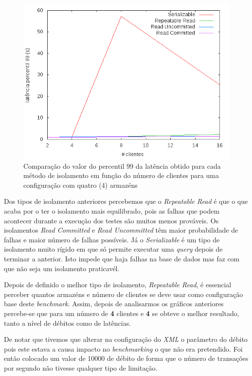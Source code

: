 \begin{figure}[!h]
\centering
\includegraphics[scale=.5]{img/questao-1/diff-lat-pct99-4-arm}
\caption{Comparação do valor do percentil 99 da latência obtido para cada método de isolamento em função do número de clientes para uma configuração com quatro (4) armazéns}
\end{figure}

Dos tipos de isolamento anteriores percebemos que o \textit{Repeatable Read} é que o que acaba por o ter o isolamento mais equilibrado, pois as falhas que podem acontecer durante a execução dos testes são muitos menos prováveis. Os isolamentos \textit{Read Committed} e \textit{Read Uncommitted} têm maior probabilidade de falhas e maior número de falhas possíveis. Já o \textit{Serializable} é um tipo de isolamento muito rígido em que só permite executar uma \textit{query} depois de terminar a anterior. Isto impede que haja falhas na base de dados mas faz com que não seja um isolamento praticavél.

Depois de definido o melhor tipo de isolamento, \textit{Repeatable Read}, é essencial perceber quantos armazéns e número de clientes se deve usar como configuração base deste \textit{benchmark}. Assim, depois de analisarmos os gráficos anteriores percebe-se que para um número de \textbf{4} clientes e \textbf{4} se obteve o melhor resultado, tanto a nível de débitos como de latências.

De notar que tivemos que alterar na configuração do \textit{XML} o parâmetro do débito pois este estava a causa impacto no \textit{benchmarking} o que não era pretendido. Foi então colocado um valor de 10000 de débito de forma que o número de transações por segundo não tivesse qualquer tipo de limitação.


